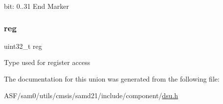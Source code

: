 bit\+: 0..31 End Marker \mbox{\label{union_d_s_u___e_n_d___type_a6b91636401516a477989a336376d7b40}} 
\subsubsection{\texorpdfstring{reg}{reg}}
{\footnotesize\ttfamily uint32\+\_\+t reg}

Type used for register access 

The documentation for this union was generated from the following file\+:\begin{DoxyCompactItemize}
\item 
A\+S\+F/sam0/utils/cmsis/samd21/include/component/\mbox{\hyperlink{component_2dsu_8h}{dsu.\+h}}\end{DoxyCompactItemize}
